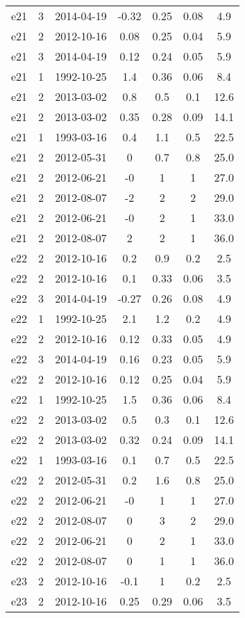 \begin{table*}[htp]
\begin{tabular}{ccccccc}
e21 & 3 & 2014-04-19 & -0.32 & 0.25 & 0.08 & 4.9 \\
e21 & 2 & 2012-10-16 & 0.08 & 0.25 & 0.04 & 5.9 \\
e21 & 3 & 2014-04-19 & 0.12 & 0.24 & 0.05 & 5.9 \\
e21 & 1 & 1992-10-25 & 1.4 & 0.36 & 0.06 & 8.4 \\
e21 & 2 & 2013-03-02 & 0.8 & 0.5 & 0.1 & 12.6 \\
e21 & 2 & 2013-03-02 & 0.35 & 0.28 & 0.09 & 14.1 \\
e21 & 1 & 1993-03-16 & 0.4 & 1.1 & 0.5 & 22.5 \\
e21 & 2 & 2012-05-31 & 0 & 0.7 & 0.8 & 25.0 \\
e21 & 2 & 2012-06-21 & -0 & 1 & 1 & 27.0 \\
e21 & 2 & 2012-08-07 & -2 & 2 & 2 & 29.0 \\
e21 & 2 & 2012-06-21 & -0 & 2 & 1 & 33.0 \\
e21 & 2 & 2012-08-07 & 2 & 2 & 1 & 36.0 \\
e22 & 2 & 2012-10-16 & 0.2 & 0.9 & 0.2 & 2.5 \\
e22 & 2 & 2012-10-16 & 0.1 & 0.33 & 0.06 & 3.5 \\
e22 & 3 & 2014-04-19 & -0.27 & 0.26 & 0.08 & 4.9 \\
e22 & 1 & 1992-10-25 & 2.1 & 1.2 & 0.2 & 4.9 \\
e22 & 2 & 2012-10-16 & 0.12 & 0.33 & 0.05 & 4.9 \\
e22 & 3 & 2014-04-19 & 0.16 & 0.23 & 0.05 & 5.9 \\
e22 & 2 & 2012-10-16 & 0.12 & 0.25 & 0.04 & 5.9 \\
e22 & 1 & 1992-10-25 & 1.5 & 0.36 & 0.06 & 8.4 \\
e22 & 2 & 2013-03-02 & 0.5 & 0.3 & 0.1 & 12.6 \\
e22 & 2 & 2013-03-02 & 0.32 & 0.24 & 0.09 & 14.1 \\
e22 & 1 & 1993-03-16 & 0.1 & 0.7 & 0.5 & 22.5 \\
e22 & 2 & 2012-05-31 & 0.2 & 1.6 & 0.8 & 25.0 \\
e22 & 2 & 2012-06-21 & -0 & 1 & 1 & 27.0 \\
e22 & 2 & 2012-08-07 & 0 & 3 & 2 & 29.0 \\
e22 & 2 & 2012-06-21 & 0 & 2 & 1 & 33.0 \\
e22 & 2 & 2012-08-07 & 0 & 1 & 1 & 36.0 \\
e23 & 2 & 2012-10-16 & -0.1 & 1 & 0.2 & 2.5 \\
e23 & 2 & 2012-10-16 & 0.25 & 0.29 & 0.06 & 3.5 \\

\end{tabular}
\end{table*}
